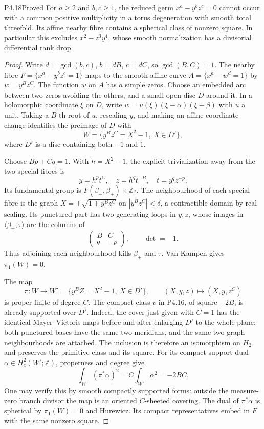 \begin{statement}{P4.18}{Proved}
For $a\geq2$ and $b,c\geq1$, the reduced germ
$x^a-y^bz^c=0$ cannot occur with a common positive multiplicity
in a torus degeneration with smooth total threefold. Its affine
nearby fibre contains a spherical class of nonzero square.
In particular this excludes $x^2-z^3y^4$, whose smooth
normalization has a divisorial differential rank drop.
\end{statement}
\begin{proof}
Write $d=\gcd(b,c)$, $b=dB$, $c=dC$, so $\gcd(B,C)=1$.
The nearby fibre $F=\{x^a-y^bz^c=1\}$ maps to the smooth
affine curve $A=\{x^a-w^d=1\}$ by $w=y^Bz^C$.
The function $w$ on $A$ has $a$ simple zeros. Choose an
embedded arc between two zeros avoiding the others, and a
small open disc $D$ around it. In a holomorphic coordinate
$\xi$ on $D$, write $w=u(\xi)(\xi-\alpha)(\xi-\beta)$
with $u$ a unit. Taking a $B$-th root of $u$, rescaling $y$,
and making an affine coordinate change identifies the preimage
of $D$ with
\[
 W=\{y^Bz^C=X^2-1,\ X\in D'\},
\]
where $D'$ is a disc containing both $-1$ and $1$.

Choose $Bp+Cq=1$. With $h=X^2-1$, the explicit trivialization
away from the two special fibres is
\[
 y=h^pt^C,\quad z=h^qt^{-B},\quad t=y^qz^{-p}.
\]
Its fundamental group is $F(\beta_-,\beta_+)\times\mathbb Z\tau$.
The neighbourhood of each special fibre is the graph
$X=\pm\sqrt{1+y^Bz^C}$ on $|y^Bz^C|<\delta$, a contractible
domain by real scaling. Its punctured part has two generating
loops in $y,z$, whose images in $\langle\beta_\pm,\tau\rangle$
are the columns of
\[
 \begin{pmatrix}B&C\\q&-p\end{pmatrix},\qquad \det=-1.
\]
Thus adjoining each neighbourhood kills $\beta_\pm$ and $\tau$.
Van Kampen gives $\pi_1(W)=0$.

The map
\[
 \pi:W\longrightarrow W'=\{y^BZ=X^2-1,\ X\in D'\},
 \qquad (X,y,z)\longmapsto(X,y,z^C)
\]
is proper finite of degree $C$. The compact class $v$ in
P4.16, of square $-2B$, is already supported over $D'$.
Indeed, the cover just given with $C=1$ has the identical
Mayer--Vietoris maps before and after enlarging $D'$ to the
whole plane: both punctured bases have the same two meridians,
and the same two graph neighbourhoods are attached. The
inclusion is therefore an isomorphism on $H_2$ and preserves
the primitive class and its square.
For its compact-support dual $\alpha\in H_c^2(W';\mathbb Z)$,
properness and degree give
\[
 \int_W(\pi^*\alpha)^2=C\int_{W'}\alpha^2=-2BC.
\]
One may verify this by smooth compactly supported forms:
outside the measure-zero branch divisor the map is an oriented
$C$-sheeted covering. The dual of $\pi^*\alpha$ is spherical
by $\pi_1(W)=0$ and Hurewicz. Its compact representatives
embed in $F$ with the same nonzero square.


\end{proof}
